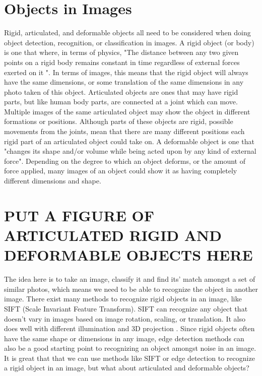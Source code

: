 \documentclass[12pt]{article} %
\begin{document}
\section{Objects in Images}
	Rigid, articulated, and deformable objects all need to be considered when doing object detection, recognition, or classification in images. A rigid object (or body) is one that where, in terms of physics, "The distance between any two given points on a rigid body remains constant in time regardless of external forces exerted on it "\cite{RigidBodyWiki}. In terms of images, this means that the rigid object will always have the same dimensions, or some translation of the same dimensions in any photo taken of this object. Articulated objects are ones that may have rigid parts, but like human body parts, are connected at a joint which can move\cite{szeliski2010computer}. Multiple images of the same articulated object may show the object in different formations or positions. Although parts of these objects are rigid, possible movements from the joints, mean that there are many different positions each rigid part of an articulated object could take on. A deformable object is one that "changes its shape and/or volume while being acted upon by any kind of external force"\cite{wolfram}. Depending on the degree to which an object deforms, or the amount of force applied, many images of an object could show it as having completely different dimensions and shape. 
	
\section{PUT A FIGURE OF ARTICULATED RIGID AND DEFORMABLE OBJECTS HERE}
	
	
	The idea here is to take an image, classify it and find its' match amongst a set of similar photos, which means we need to be able to recognize the object in another image. There 	exist many methods to recognize rigid objects in an image, like SIFT (Scale Invariant Feature Transform). SIFT can recognize any object that doesn't vary in images based on image rotation, scaling, or translation. It also does well with different illumination and 3D projection \cite{lowe1999object}. Since rigid objects often have the same shape or dimensions in any image, edge detection methods can also be a good starting point to recognizing an object amongst noise in an image. It is great that that we can use methods like SIFT or edge detection to recognize a rigid object in an image, but what about articulated and deformable objects? 
\end{document}
